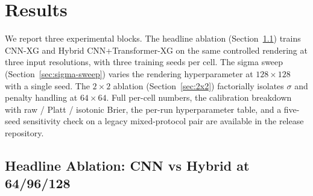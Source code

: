 \documentclass[runningheads,a4paper]{llncs}
\begin{document}
\section{Results}
\label{sec:results}

We report three experimental blocks. The headline ablation
(Section~\ref{sec:headline}) trains CNN-XG and Hybrid CNN+Transformer-XG
on the same controlled rendering at three input resolutions, with three
training seeds per cell. The sigma sweep (Section~\ref{sec:sigma-sweep})
varies the rendering hyperparameter at $128{\times}128$ with a single
seed. The $2{\times}2$ ablation (Section~\ref{sec:2x2}) factorially
isolates $\sigma$ and penalty handling at $64{\times}64$. Full per-cell
numbers, the calibration breakdown with raw / Platt / isotonic Brier,
the per-run hyperparameter table, and a five-seed sensitivity check on
a legacy mixed-protocol pair are available in the release repository.

\subsection{Headline Ablation: CNN vs Hybrid at 64/96/128}
\label{sec:headline}

\begin{table}[t]
\centering
\caption{Controlled six-cell headline ablation
($\sigma_{\text{pu}}=2.0$, penalty-excluded, $n{=}3$ seeds per cell;
test split, validation-best checkpoint).
\textbf{At matched resolution, Hybrid 128 outperforms CNN 128 on every
headline metric; the same-resolution PR-AUC gain ($+0.035$) is the
largest effect.}}
\label{tab:headline}
\end{table}
\end{document}
